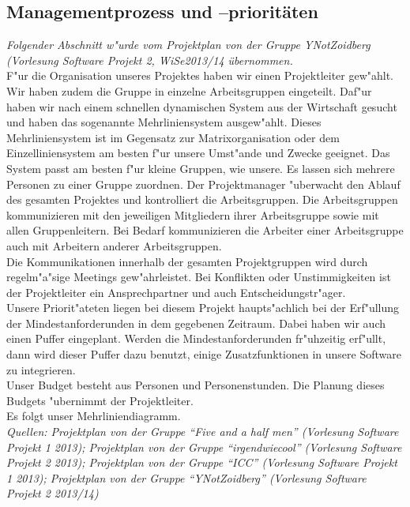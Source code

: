 \documentclass[fontsize=12pt,paper=a4,twoside]{scrartcl}
\begin{document}
\subsection{Managementprozess und --prioritäten}

\textit{Folgender Abschnitt w"urde vom Projektplan von der Gruppe YNotZoidberg (Vorlesung Software Projekt 2, WiSe2013/14 übernommen.}\\

F"ur die Organisation unseres Projektes haben wir einen Projektleiter gew"ahlt.\\
Wir haben zudem die Gruppe in einzelne Arbeitsgruppen eingeteilt. Daf"ur haben wir nach einem schnellen dynamischen System aus der Wirtschaft gesucht und haben das sogenannte Mehrliniensystem ausgew"ahlt. Dieses Mehrliniensystem ist im Gegensatz zur Matrixorganisation oder dem Einzelliniensystem am besten f"ur unsere Umst"ande und Zwecke geeignet. Das System passt am besten f"ur kleine Gruppen, wie unsere. Es lassen sich mehrere Personen zu einer Gruppe zuordnen. \newline
Der Projektmanager "uberwacht den Ablauf des gesamten Projektes und kontrolliert die Arbeitsgruppen. Die Arbeitsgruppen kommunizieren mit den jeweiligen Mitgliedern ihrer Arbeitsgruppe sowie mit allen Gruppenleitern. Bei Bedarf kommunizieren die Arbeiter einer Arbeitsgruppe auch mit Arbeitern anderer Arbeitsgruppen. \\
Die Kommunikationen innerhalb der gesamten Projektgruppen wird durch regelm"a"sige Meetings gew"ahrleistet. Bei Konflikten oder Unstimmigkeiten ist der Projektleiter ein Ansprechpartner und auch Entscheidungstr"ager.\\
Unsere Priorit"ateten liegen bei diesem Projekt haupts"achlich bei der Erf"ullung der Mindestanforderunden in dem gegebenen Zeitraum. Dabei haben wir auch einen Puffer eingeplant. Werden die Mindestanforderunden fr"uhzeitig erf"ullt, dann wird dieser Puffer dazu benutzt, einige Zusatzfunktionen in unsere Software zu integrieren. \\
Unser Budget besteht aus Personen und Personenstunden. Die Planung dieses Budgets "ubernimmt der Projektleiter.\\
Es folgt unser Mehrliniendiagramm.\\
\textit{Quellen: Projektplan von der Gruppe ``Five and a half men'' (Vorlesung Software Projekt 1 2013); Projektplan von der Gruppe ``irgendwiecool'' (Vorlesung Software Projekt 2 2013); Projektplan von der Gruppe ``ICC'' (Vorlesung Software Projekt 1 2013);  Projektplan von der Gruppe ``YNotZoidberg'' (Vorlesung Software Projekt 2 2013/14)}
\end{document}
